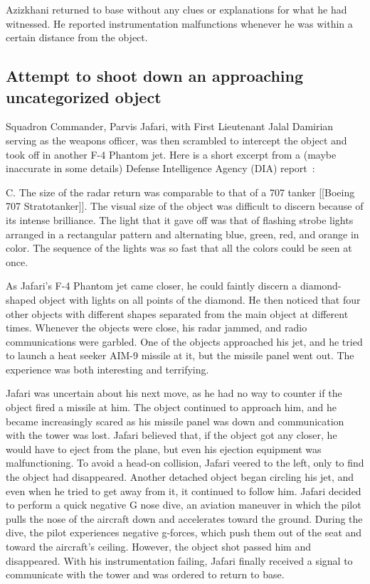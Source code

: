 Azizkhani returned to base without any clues or explanations for what he had witnessed.
He reported instrumentation malfunctions whenever he was within a certain distance from the object.


\subsection{Attempt to shoot down an approaching uncategorized object}

Squadron Commander, Parvis Jafari, with First Lieutenant Jalal Damirian serving as the weapons officer,
was then scrambled to intercept the object and took off  in another F-4 Phantom jet.
Here is a short excerpt from a (maybe inaccurate in some details) Defense Intelligence Agency (DIA) report~\cite{DIA76}:
\begin{svgraybox}
C. The size of the radar return was comparable to that of a 707 tanker [[Boeing 707 Stratotanker]].
The visual size of the object was difficult to discern because of its intense brilliance.
The light that it gave off was that of flashing strobe lights arranged in a rectangular pattern and alternating blue, green, red, and orange in color.
The sequence of the lights was so fast that all the colors could be seen at once.
\end{svgraybox}

As Jafari's F-4 Phantom jet came closer, he could faintly discern a diamond-shaped object with lights on all points of the diamond.
He then noticed that four other objects with different shapes separated from the main object at different times.
Whenever the objects were close, his radar jammed, and radio communications were garbled.
One of the objects approached his jet, and he tried to launch a heat seeker AIM-9 missile at it, but the missile panel went out.
The experience was both interesting and terrifying.

Jafari was uncertain about his next move, as he had no way to counter if the object fired a missile at him. The object continued to approach him, and he became increasingly scared as his missile panel was down and communication with the tower was lost. Jafari believed that, if the object got any closer, he would have to eject from the plane, but even his ejection equipment was malfunctioning. To avoid a head-on collision, Jafari veered to the left, only to find the object had disappeared. Another detached object began circling his jet, and even when he tried to get away from it, it continued to follow him.
Jafari decided to perform a quick negative G nose dive, an aviation maneuver in which the pilot pulls the nose of the aircraft down and accelerates toward the ground. During the dive, the pilot experiences negative g-forces, which push them out of the seat and toward the aircraft's ceiling. However,
the object shot passed him and disappeared.
With his instrumentation failing, Jafari finally received a signal to communicate with the tower and was ordered to return to base.

